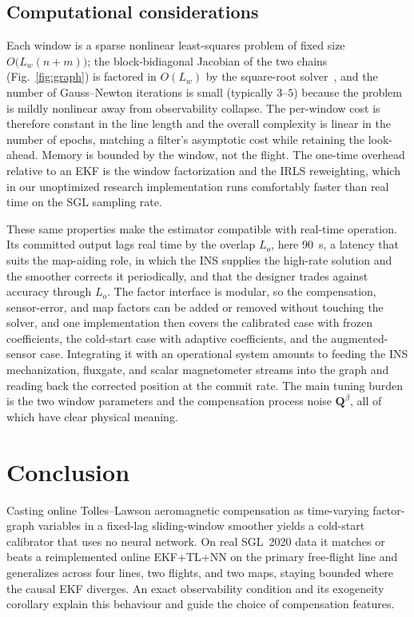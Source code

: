 \documentclass{IEEEtaes}
\begin{document}
\subsection{Computational considerations}
Each window is a sparse nonlinear least-squares problem of fixed size
$O\big(L_w(n+m)\big)$; the block-bidiagonal Jacobian of the two chains
(Fig.~\ref{fig:graph}) is factored in $O(L_w)$ by the square-root
solver~\cite{dellaert2006}, and the number of Gauss--Newton iterations is small
(typically $3$--$5$) because the problem is mildly nonlinear away from observability
collapse. The per-window cost is therefore constant in the line length and the
overall complexity is linear in the number of epochs, matching a filter's
asymptotic cost while retaining the look-ahead. Memory is bounded by the window,
not the flight. The one-time overhead relative to an EKF is the window
factorization and the IRLS reweighting, which in our unoptimized research
implementation runs comfortably faster than real time on the SGL sampling rate.

These same properties make the estimator compatible with real-time operation. Its
committed output lags real time by the overlap $L_o$, here \SI{90}{\second}, a
latency that suits the map-aiding role, in which the INS supplies the high-rate
solution and the smoother corrects it periodically, and that the designer trades
against accuracy through $L_o$. The factor interface is modular, so the
compensation, sensor-error, and map factors can be added or removed without touching
the solver, and one implementation then covers the calibrated case with frozen
coefficients, the cold-start case with adaptive coefficients, and the
augmented-sensor case. Integrating it with an operational system amounts to feeding
the INS mechanization, fluxgate, and scalar magnetometer streams into the graph and
reading back the corrected position at the commit rate. The main tuning burden is
the two window parameters and the compensation process noise $\mathbf{Q}^{\beta}$,
all of which have clear physical meaning.

\section{Conclusion}\label{sec:conclusion}
Casting online Tolles--Lawson aeromagnetic compensation as time-varying
factor-graph variables in a fixed-lag sliding-window smoother yields a cold-start
calibrator that uses no neural network. On real SGL~2020 data it matches or beats a
reimplemented online EKF+TL+NN on the primary free-flight line and generalizes
across four lines, two flights, and two maps, staying bounded where the causal EKF
diverges. An exact observability condition and its exogeneity corollary explain this
behaviour and guide the choice of compensation features.
\end{document}
